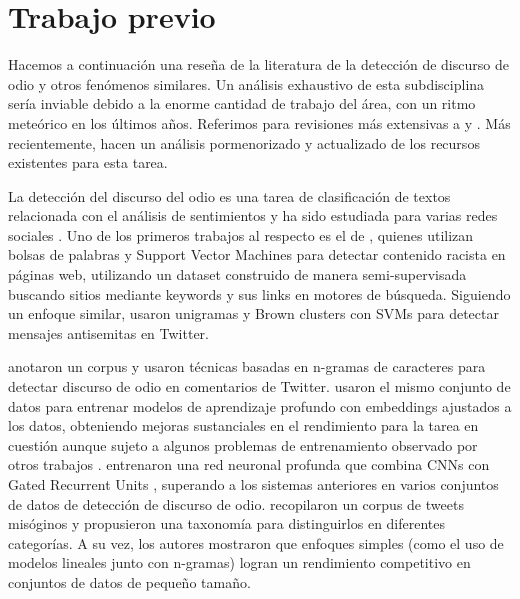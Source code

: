 

\section{Trabajo previo}
\label{sec:hate_speech_previous_work}

Hacemos a continuación una reseña de la literatura de la detección de discurso de odio y otros fenómenos similares. Un análisis exhaustivo de esta subdisciplina sería inviable debido a la enorme cantidad de trabajo del área, con un ritmo meteórico en los últimos años. Referimos para revisiones más extensivas a \citet{schmidt2017survey} y \citet{fortuna2018survey}. Más recientemente, \citet{poletto2021resources} hacen un análisis pormenorizado y actualizado de los recursos existentes para esta tarea.

La detección del discurso del odio es una tarea de clasificación de textos relacionada con el análisis de sentimientos y ha sido estudiada para varias redes sociales \cite{thelwall2008social, pak2010twitter, saleem2017web}. Uno de los primeros trabajos al respecto es el de \citet{greevy2004classifying}, quienes utilizan bolsas de palabras y Support Vector Machines para detectar contenido racista en páginas web, utilizando un dataset construido de manera semi-supervisada buscando sitios mediante keywords y sus links en motores de búsqueda. Siguiendo un enfoque similar, \citet{warner2012detecting} usaron unigramas y Brown clusters \cite{brown1992class} con SVMs para detectar mensajes antisemitas en Twitter.

\citet{waseem2016hateful} anotaron un corpus y usaron técnicas basadas en n-gramas de caracteres para detectar discurso de odio en comentarios de Twitter. \citet{badjatiya2017deep} usaron el mismo conjunto de datos para entrenar modelos de aprendizaje profundo con embeddings ajustados a los datos, obteniendo mejoras sustanciales en el rendimiento para la tarea en cuestión aunque sujeto a algunos problemas de entrenamiento observado por otros trabajos \cite{arango2019hate}. \citet{zhang2018detecting} entrenaron una red neuronal profunda que combina CNNs con Gated Recurrent Units \cite{cho2014learning}, superando a los sistemas anteriores en varios conjuntos de datos de detección de discurso de odio. \citet{anzovino2018automatic} recopilaron un corpus de tweets misóginos y propusieron una taxonomía para distinguirlos en diferentes categorías. A su vez, los autores mostraron que enfoques simples (como el uso de modelos lineales junto con n-gramas) logran un rendimiento competitivo en conjuntos de datos de pequeño tamaño.

